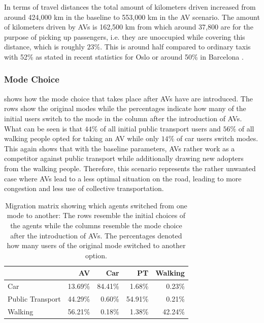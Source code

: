 In terms of travel distances the total amount of kilometers driven increased from around 424,000 km in
the baseline to 553,000 km in the AV scenario. The amount of kilometers driven by AVs
is 162,500 km from which around 37,800 are for the purpose of picking up passengers, i.e.
they are unoccupied while covering this distance, which is roughly $23\%$. This is around half
compared to ordinary taxis with 52\% as stated in recent statistics for Oslo \citep{Norway2015}
or around 50\% in Barcelona \citep{Amat2014}.

\subsubsection{Mode Choice}

 shows how the mode choice that takes place after AVs
have are introduced. The rows show the original modes while the percentages
indicate how many of the initial users switch to the mode in the column after the
introduction of AVs. What can be seen is that $44\%$ of all initial public transport
users and $56\%$ of all walking people opted for taking an AV while only $14\%$
of car users switch modes. This again shows that with the baseline parameters, AVs rather
work as a competitor against public transport while additionally drawing new adopters
from the walking people. Therefore, this scenario represents the rather unwanted case
where AVs lead to a less optimal situation on the road, leading to more
congestion and less use of collective transportation.

\begin{table}[]
\centering
\caption{Migration matrix showing which agents switched from one mode to another:
The rows resemble the initial choices of the agents while the columns resemble the
mode choice after the introduction of AVs. The percentages denoted how many users
of the original mode switched to another option.}
\label{tab:basemodeshares}
\begin{tabular}{@{}lrrrr@{}}
\toprule
                 & AV & Car     & PT & Walking \\ \midrule
Car              & 13.69\%    & 84.41\% & 1.68\%           & 0.23\%  \\
Public Transport & 44.29\%    & 0.60\%  & 54.91\%          & 0.21\%  \\
Walking          & 56.21\%    & 0.18\%  & 1.38\%           & 42.24\% \\ \bottomrule
\end{tabular}
\end{table}

